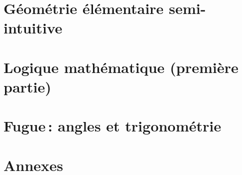 \documentclass[ twoside,openright,titlepage,numbers=noenddot,%
                headinclude,footinclude,cleardoublepage=empty,abstract=on,
                BCOR=5mm,paper=a4,fontsize=11pt
                ]{scrreprt}
\begin{document}
    \part{Géométrie élémentaire semi-intuitive}



    \part{Logique mathématique (première partie)}

\fi

\part{Fugue\,: angles et trigonométrie}\label{part_2}

















\part*{Annexes}
\appendix


\end{document}
